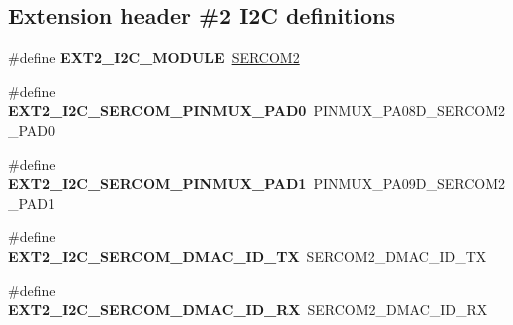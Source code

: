 \subsection*{Extension header \#2 I2\+C definitions}
\begin{DoxyCompactItemize}
\item 
\hypertarget{group__saml21__xplained__pro__features__group_ga087e46c31d1da0eaec55cdb9c5075354}{}\#define {\bfseries E\+X\+T2\+\_\+\+I2\+C\+\_\+\+M\+O\+D\+U\+L\+E}~\hyperlink{group___s_a_m_l21_j18_a__base_ga918e4c85993961a115bb23b4bb73a87f}{S\+E\+R\+C\+O\+M2}\label{group__saml21__xplained__pro__features__group_ga087e46c31d1da0eaec55cdb9c5075354}

\item 
\hypertarget{group__saml21__xplained__pro__features__group_gae8ffb217b630336bb47b3c5c9d01aa2e}{}\#define {\bfseries E\+X\+T2\+\_\+\+I2\+C\+\_\+\+S\+E\+R\+C\+O\+M\+\_\+\+P\+I\+N\+M\+U\+X\+\_\+\+P\+A\+D0}~P\+I\+N\+M\+U\+X\+\_\+\+P\+A08\+D\+\_\+\+S\+E\+R\+C\+O\+M2\+\_\+\+P\+A\+D0\label{group__saml21__xplained__pro__features__group_gae8ffb217b630336bb47b3c5c9d01aa2e}

\item 
\hypertarget{group__saml21__xplained__pro__features__group_ga2b0d1721964c28bd886ab93b0d774ad2}{}\#define {\bfseries E\+X\+T2\+\_\+\+I2\+C\+\_\+\+S\+E\+R\+C\+O\+M\+\_\+\+P\+I\+N\+M\+U\+X\+\_\+\+P\+A\+D1}~P\+I\+N\+M\+U\+X\+\_\+\+P\+A09\+D\+\_\+\+S\+E\+R\+C\+O\+M2\+\_\+\+P\+A\+D1\label{group__saml21__xplained__pro__features__group_ga2b0d1721964c28bd886ab93b0d774ad2}

\item 
\hypertarget{group__saml21__xplained__pro__features__group_gaf66e4471b1d6a8bcb6bb13271d265b59}{}\#define {\bfseries E\+X\+T2\+\_\+\+I2\+C\+\_\+\+S\+E\+R\+C\+O\+M\+\_\+\+D\+M\+A\+C\+\_\+\+I\+D\+\_\+\+T\+X}~S\+E\+R\+C\+O\+M2\+\_\+\+D\+M\+A\+C\+\_\+\+I\+D\+\_\+\+T\+X\label{group__saml21__xplained__pro__features__group_gaf66e4471b1d6a8bcb6bb13271d265b59}

\item 
\hypertarget{group__saml21__xplained__pro__features__group_ga69fb9178b70ed36684ae6132b2c95d0a}{}\#define {\bfseries E\+X\+T2\+\_\+\+I2\+C\+\_\+\+S\+E\+R\+C\+O\+M\+\_\+\+D\+M\+A\+C\+\_\+\+I\+D\+\_\+\+R\+X}~S\+E\+R\+C\+O\+M2\+\_\+\+D\+M\+A\+C\+\_\+\+I\+D\+\_\+\+R\+X\label{group__saml21__xplained__pro__features__group_ga69fb9178b70ed36684ae6132b2c95d0a}

\end{DoxyCompactItemize}
